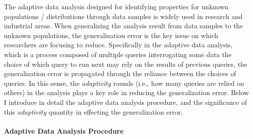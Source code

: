 The adaptive data analysis designed for identifying  properties for unknown populations / distributions 
through data samples is widely 
used in research and industrial areas.
When generalizing the analysis result from data samples to the unknown populations, 
the generalization error is the key issue on which researchers are focusing to reduce.
Specifically in the adaptive data analysis,
which is a process composed of 
multiple queries interrogating some data
the choice of which query to run next may rely on the results of previous queries,
the generalization error is propagated through the reliance between the choices of queries.
In this sense, the \emph{adaptivity} rounds (i.e., how many queries are relied on others) in the analysis plays a key role in reducing the generalization error.
Below I introduce in detail the adaptive data analysis procedure,
and the significance of this \emph{adaptivity} quantity in effecting the generalization error.

\paragraph{Adaptive Data Analysis Procedure}




